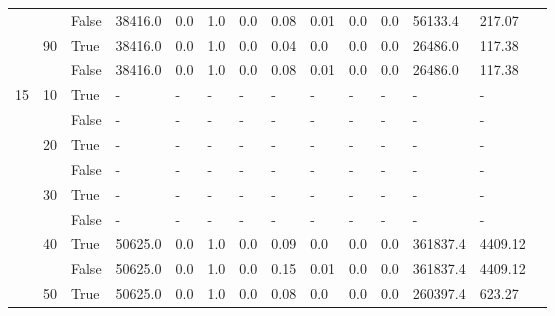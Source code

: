 \documentclass{article}
\begin{document}
\begin{landscape}
\begin{small}
\begin{longtable}[c]{@{}lll|ll|ll|ll|ll|lll@{}}
   &    & False & 38416.0         & 0.0            & 1.0           & 0.0           & 0.08          & 0.01          & 0.0           & 0.0           & 56133.4       & 217.07      &  \\
   & 90 & True  & 38416.0         & 0.0            & 1.0           & 0.0           & 0.04          & 0.0           & 0.0           & 0.0           & 26486.0       & 117.38      &  \\
   &    & False & 38416.0         & 0.0            & 1.0           & 0.0           & 0.08          & 0.01          & 0.0           & 0.0           & 26486.0       & 117.38      &  \\
  \midrule
15 & 10 & True  & -               & -              & -             & -             & -             & -             & -             & -             & -             & -           &  \\
   &    & False & -               & -              & -             & -             & -             & -             & -             & -             & -             & -           &  \\
   & 20 & True  & -               & -              & -             & -             & -             & -             & -             & -             & -             & -           &  \\
   &    & False & -               & -              & -             & -             & -             & -             & -             & -             & -             & -           &  \\
   & 30 & True  & -               & -              & -             & -             & -             & -             & -             & -             & -             & -           &  \\
   &    & False & -               & -              & -             & -             & -             & -             & -             & -             & -             & -           &  \\
   & 40 & True  & 50625.0         & 0.0            & 1.0           & 0.0           & 0.09          & 0.0           & 0.0           & 0.0           & 361837.4      & 4409.12     &  \\
   &    & False & 50625.0         & 0.0            & 1.0           & 0.0           & 0.15          & 0.01          & 0.0           & 0.0           & 361837.4      & 4409.12     &  \\
   & 50 & True  & 50625.0         & 0.0            & 1.0           & 0.0           & 0.08          & 0.0           & 0.0           & 0.0           & 260397.4      & 623.27      &  \\

\end{longtable}
\end{small}
\end{landscape}
\end{document}
